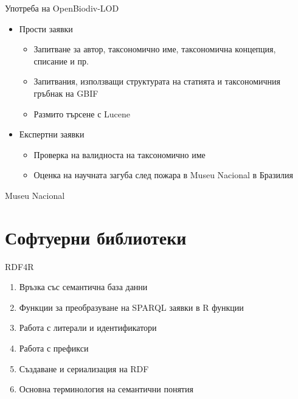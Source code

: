 \documentclass[bulgarian]{beamer}
\begin{document}
\begin{frame}{Употреба на OpenBiodiv-LOD}
\begin{itemize}
    \item Прости заявки
    \begin{itemize}
        \item Запитване за автор, таксономично име, таксономична концепция, списание и пр.
        \item Запитвания, използващи структурата на статията и таксономичния гръбнак на GBIF
        \item Размито търсене с Lucene
    \end{itemize}
    \item Експертни заявки
    \begin{itemize}
        \item Проверка на валидноста на таксономично име
        \item Оценка на научната загуба след пожара в Museu Nacional в Бразилия
    \end{itemize}
\end{itemize}
\end{frame}


\begin{frame}{Museu Nacional}



\end{frame}

\section{Софтуерни библиотеки}

\begin{frame}{RDF4R}

\begin{enumerate}
    \item Връзка със семантична база данни
    \item Функции за преобразуване на SPARQL заявки в R функции
    \item Работа с литерали и идентификатори
    \item Работа с префикси
    \item Създаване и сериализация на RDF
    \item Основна терминология на семантични понятия
\end{enumerate}
\end{frame}
\end{document}
